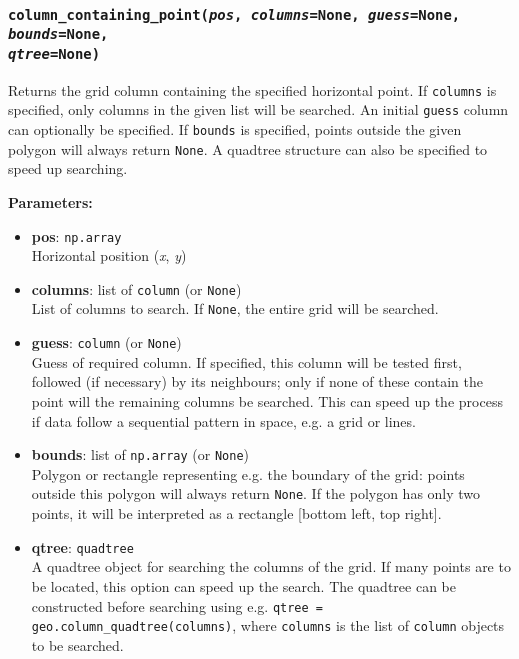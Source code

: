 \subsubsection{\texttt{column\_containing\_point(\emph{pos}, \emph{columns}=None, \emph{guess}=None, \emph{bounds}=None,\\
\emph{qtree}=None)}}

Returns the grid column containing the specified horizontal point.  If \texttt{columns} is specified, only columns in the given list will be searched.  An initial \texttt{guess} column can optionally be specified.  If \texttt{bounds} is specified, points outside the given polygon will always return \texttt{None}.  A quadtree structure can also be specified to speed up searching.

\textbf{Parameters:}
\begin{itemize}
\item \textbf{pos}: \texttt{np.array}\\
  Horizontal position (\emph{x}, \emph{y})
\item \textbf{columns}: list of \texttt{column} (or \texttt{None})\\
  List of columns to search.  If \texttt{None}, the entire grid will be searched.
\item \textbf{guess}: \texttt{column} (or \texttt{None})\\
  Guess of required column.  If specified, this column will be tested first, followed (if necessary) by its neighbours; only if none of these contain the point will the remaining columns be searched.  This can speed up the process if data follow a sequential pattern in space, e.g. a grid or lines.
 \item \textbf{bounds}: list of \texttt{np.array} (or \texttt{None})\\
  Polygon or rectangle representing e.g. the boundary of the grid: points outside this polygon will always return \texttt{None}.  If the polygon has only two points, it will be interpreted as a rectangle [bottom left, top right].
 \item \textbf{qtree}: \texttt{quadtree} \\
   A quadtree object for searching the columns of the grid.  If many points are to be located, this option can speed up the search.  The quadtree can be constructed before searching using e.g. \texttt{qtree = geo.column\_quadtree(columns)}, where \texttt{columns} is the list of \texttt{column} objects to be searched.
\end{itemize}

